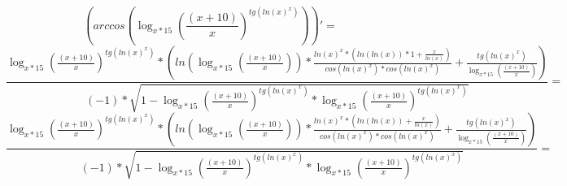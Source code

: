 \documentclass[a4paper,12pt]{article}
\begin{document}
\begin{equation}
\left( arccos \left( {{\log_{{x }* {15 }}\left( {\frac{{\left( {x }+ {10 }\right) }}{{x }}}\right) }^ {tg \left( {{ln \left( {x }\right) }^ {x }}\right) }}\right) \right)' =
\end{equation}
\begin{equation}
\frac{{{{\log_{{x }* {15 }}\left( {\frac{{\left( {x }+ {10 }\right) }}{{x }}}\right) }^ {tg \left( {{ln \left( {x }\right) }^ {x }}\right) }}* {\left( {{ln \left( {\log_{{x }* {15 }}\left( {\frac{{\left( {x }+ {10 }\right) }}{{x }}}\right) }\right) }* {\frac{{{{ln \left( {x }\right) }^ {x }}* {\left( {{ln \left( {ln \left( {x }\right) }\right) }* {1 }}+ {\frac{{x }}{{ln \left( {x }\right) }}}\right) }}}{{{cos \left( {{ln \left( {x }\right) }^ {x }}\right) }* {cos \left( {{ln \left( {x }\right) }^ {x }}\right) }}}}}+ {\frac{{tg \left( {{ln \left( {x }\right) }^ {x }}\right) }}{{\log_{{x }* {15 }}\left( {\frac{{\left( {x }+ {10 }\right) }}{{x }}}\right) }}}\right) }}}{{{\left( -1 \right) }* {\sqrt {{{1 }- {{{\log_{{x }* {15 }}\left( {\frac{{\left( {x }+ {10 }\right) }}{{x }}}\right) }^ {tg \left( {{ln \left( {x }\right) }^ {x }}\right) }}* {{\log_{{x }* {15 }}\left( {\frac{{\left( {x }+ {10 }\right) }}{{x }}}\right) }^ {tg \left( {{ln \left( {x }\right) }^ {x }}\right) }}}}} }}}=
\end{equation}
\begin{equation}
\frac{{{{\log_{{x }* {15 }}\left( {\frac{{\left( {x }+ {10 }\right) }}{{x }}}\right) }^ {tg \left( {{ln \left( {x }\right) }^ {x }}\right) }}* {\left( {{ln \left( {\log_{{x }* {15 }}\left( {\frac{{\left( {x }+ {10 }\right) }}{{x }}}\right) }\right) }* {\frac{{{{ln \left( {x }\right) }^ {x }}* {\left( {ln \left( {ln \left( {x }\right) }\right) }+ {\frac{{x }}{{ln \left( {x }\right) }}}\right) }}}{{{cos \left( {{ln \left( {x }\right) }^ {x }}\right) }* {cos \left( {{ln \left( {x }\right) }^ {x }}\right) }}}}}+ {\frac{{tg \left( {{ln \left( {x }\right) }^ {x }}\right) }}{{\log_{{x }* {15 }}\left( {\frac{{\left( {x }+ {10 }\right) }}{{x }}}\right) }}}\right) }}}{{{\left( -1 \right) }* {\sqrt {{{1 }- {{{\log_{{x }* {15 }}\left( {\frac{{\left( {x }+ {10 }\right) }}{{x }}}\right) }^ {tg \left( {{ln \left( {x }\right) }^ {x }}\right) }}* {{\log_{{x }* {15 }}\left( {\frac{{\left( {x }+ {10 }\right) }}{{x }}}\right) }^ {tg \left( {{ln \left( {x }\right) }^ {x }}\right) }}}}} }}}=
\end{equation}
\end{document}
